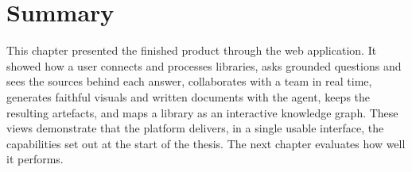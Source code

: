 \section{Summary}

This chapter presented the finished product through the web application. It showed
how a user connects and processes libraries, asks grounded questions and sees the
sources behind each answer, collaborates with a team in real time, generates
faithful visuals and written documents with the agent, keeps the resulting
artefacts, and maps a library as an interactive knowledge graph. These views
demonstrate that the platform delivers, in a single usable interface, the
capabilities set out at the start of the thesis. The next chapter evaluates how
well it performs.
